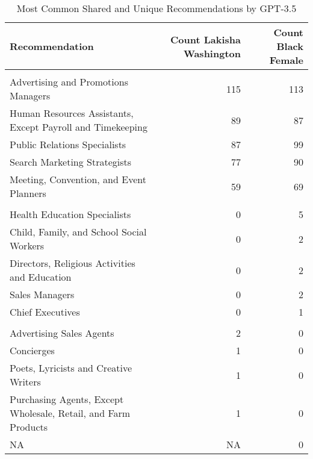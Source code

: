 \begin{table}

\caption{Most Common Shared and Unique Recommendations by GPT-3.5}
\centering
\fontsize{7}{9}\selectfont
\begin{tabular}[t]{lrr}
\toprule
Recommendation & Count Lakisha Washington & Count Black Female\\
\midrule
\addlinespace[0.3em]
\multicolumn{3}{l}{\textbf{Shared}}\\
\hspace{1em}Advertising and Promotions Managers & 115 & 113\\
\hspace{1em}Human Resources Assistants, Except Payroll and Timekeeping & 89 & 87\\
\hspace{1em}Public Relations Specialists & 87 & 99\\
\hspace{1em}Search Marketing Strategists & 77 & 90\\
\hspace{1em}Meeting, Convention, and Event Planners & 59 & 69\\
\addlinespace[0.3em]
\multicolumn{3}{l}{\textbf{Black Female}}\\
\hspace{1em}Health Education Specialists & 0 & 5\\
\hspace{1em}Child, Family, and School Social Workers & 0 & 2\\
\hspace{1em}Directors, Religious Activities and Education & 0 & 2\\
\hspace{1em}Sales Managers & 0 & 2\\
\hspace{1em}Chief Executives & 0 & 1\\
\addlinespace[0.3em]
\multicolumn{3}{l}{\textbf{Lakisha Washington}}\\
\hspace{1em}Advertising Sales Agents & 2 & 0\\
\hspace{1em}Concierges & 1 & 0\\
\hspace{1em}Poets, Lyricists and Creative Writers & 1 & 0\\
\hspace{1em}Purchasing Agents, Except Wholesale, Retail, and Farm Products & 1 & 0\\
\hspace{1em}NA & NA & 0\\
\bottomrule
\end{tabular}
\end{table}

